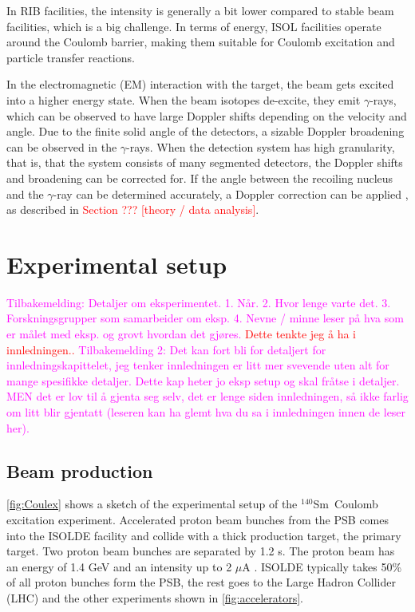 \documentclass[twoside,english]{uiofysmaster/uiofysmaster}
\newcommand{\Sm}{$^{140}$Sm} %
\newcommand{\ga}{$\gamma$}
\let\orgautoref\autoref
\renewcommand{\autoref}
        {%
		 \def\sectionautorefname{Section}%
		 \def\subsectionautorefname{Section}%
		 \def\subsubsectionautorefname{Section}%
		 \def\chapterautorefname{Chapter}%
          \orgautoref}
\begin{document}
In RIB facilities, the intensity is generally a bit lower compared to stable beam facilities, which is a big challenge. 
In terms of energy, ISOL facilities operate around the Coulomb barrier, making them suitable for Coulomb excitation and particle transfer reactions. 

In the electromagnetic (EM) interaction with the target, the beam gets excited into a higher energy state.
When the beam isotopes de-excite, they emit \ga-rays, which can be observed to have large Doppler shifts depending on the velocity and angle.
Due to the finite solid angle of the detectors, a sizable Doppler broadening can be observed in the \ga-rays. 
When the detection system has high granularity, that is, that the system consists of many segmented detectors, the Doppler shifts and broadening can be corrected for. 
If the angle between the recoiling nucleus and the \ga-ray can be determined accurately, a Doppler correction can be applied \cite{MB-spect}, as described in \textcolor{red}{Section ??? [theory / data analysis]}.


\section{Experimental setup}

\textcolor{Magenta}{Tilbakemelding:\newline
Detaljer om eksperimentet. 1. Når. 2. Hvor lenge varte det. 3. Forskningsgrupper som samarbeider om eksp. 4. Nevne / minne leser på hva som er målet med eksp. og grovt hvordan det gjøres.
} 
\textcolor{red}{Dette tenkte jeg å ha i innledningen..}
\textcolor{Magenta}{Tilbakemelding 2:\newline
Det kan fort bli for detaljert for innledningskapittelet, jeg tenker innledningen er litt mer svevende uten alt for mange spesifikke detaljer. Dette kap heter jo eksp setup og skal fråtse i detaljer. MEN det er lov til å gjenta seg selv, det er lenge siden innledningen, så ikke farlig om litt blir gjentatt (leseren kan ha glemt hva du sa i innledningen innen de leser her). 
} 

\subsection{Beam production}
\autoref{fig:Coulex} shows a sketch of the experimental setup of the \Sm\ Coulomb excitation experiment. 
Accelerated proton beam bunches from the PSB comes into the ISOLDE facility and collide with a thick production target, the primary target. 
Two proton beam bunches are separated by 1.2 s.
The proton beam has an energy of 1.4 GeV and an intensity up to 2 $\mu$A \cite{TIF, TIF2013}. 
ISOLDE typically takes 50\% \cite{MB-spect} of all proton bunches form the PSB, the rest goes to the Large Hadron Collider (LHC) and the other experiments shown in \autoref{fig:accelerators}. 
\end{document}
